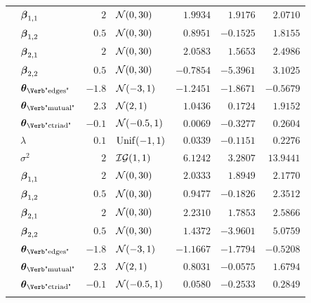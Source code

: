 \begin{table}[t]
\begin{tabular}{cl|rlrrr}
        & $\boldsymbol{\beta}_{1,1}$                   & $2$    & $\mathcal{N}(0,30)$      & $1.9934$  & $1.9176$  & $2.0710$  \\
        & $\boldsymbol{\beta}_{1,2}$                   & $0.5$  & $\mathcal{N}(0,30)$      & $0.8951$  & $-0.1525$ & $1.8155$  \\
        & $\boldsymbol{\beta}_{2,1}$                   & $2$    & $\mathcal{N}(0,30)$      & $2.0583$  & $1.5653$  & $2.4986$  \\
        & $\boldsymbol{\beta}_{2,2}$                   & $0.5$  & $\mathcal{N}(0,30)$      & $-0.7854$ & $-5.3961$ & $3.1025$  \\
        & $\ttheta_{\text{\Verb"edges"}}$  & $-1.8$ & $\mathcal{N}(-3,1)$      & $-1.2451$ & $-1.8671$ & $-0.5679$ \\
        & $\ttheta_{\text{\Verb"mutual"}}$ & $2.3$  & $\mathcal{N}(2,1)$       & $1.0436$  & $0.1724$  & $1.9152$  \\
        & $\ttheta_{\text{\Verb"ctriad"}}$ & $-0.1$ & $\mathcal{N}(-0.5,1)$    & $0.0069$  & $-0.3277$ & $0.2604$  \\
		\midrule
        & $\lambda$                        & $0.1$  & $\mathrm{Unif}(-1,1)$     & $0.0339$  & $-0.1151$ & $0.2276$  \\
        & $\sigma^2$                       & $2$    & $\mathcal{IG}(1,1)$ & $6.1242$  & $3.2807$  & $13.9441$ \\
        & $\boldsymbol{\beta}_{1,1}$                   & $2$    & $\mathcal{N}(0,30)$      & $2.0333$  & $1.8949$  & $2.1770$  \\
        & $\boldsymbol{\beta}_{1,2}$                   & $0.5$  & $\mathcal{N}(0,30)$      & $0.9477$  & $-0.1826$ & $2.3512$  \\
        & $\boldsymbol{\beta}_{2,1}$                   & $2$    & $\mathcal{N}(0,30)$      & $2.2310$  & $1.7853$  & $2.5866$  \\
        & $\boldsymbol{\beta}_{2,2}$                   & $0.5$  & $\mathcal{N}(0,30)$      & $1.4372$  & $-3.9601$ & $5.0759$  \\
        & $\ttheta_{\text{\Verb"edges"}}$  & $-1.8$ & $\mathcal{N}(-3,1)$      & $-1.1667$ & $-1.7794$ & $-0.5208$ \\
        & $\ttheta_{\text{\Verb"mutual"}}$ & $2.3$  & $\mathcal{N}(2,1)$       & $0.8031$  & $-0.0575$ & $1.6794$  \\
        & $\ttheta_{\text{\Verb"ctriad"}}$ & $-0.1$ & $\mathcal{N}(-0.5,1)$    & $0.0580$  & $-0.2533$ & $0.2849$  \\
		\midrule

\end{tabular}
\end{table}
